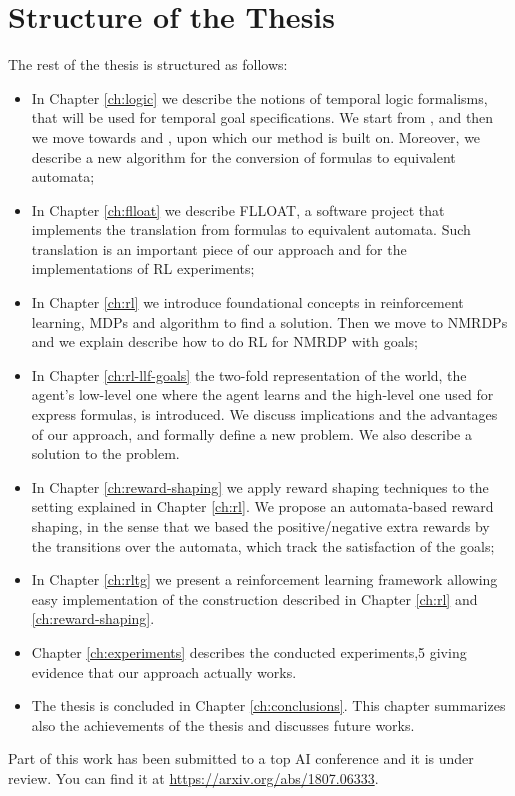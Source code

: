 \section{Structure of the Thesis}\label{sect:intro-structure-thesis}
The rest of the thesis is structured as follows:
\begin{itemize}
	\item In Chapter \ref{ch:logic} we describe the notions of temporal logic formalisms, that will be used for temporal goal specifications. We start from \LTL, \REGEX and then we move towards \LTLf and \LDLf, upon which our method is built on. Moreover, we describe a new algorithm for the conversion of \LLf formulas to equivalent automata;
	\item In Chapter \ref{ch:flloat} we describe FLLOAT, a software project that implements the translation from \LLf formulas to equivalent automata. Such translation is an important piece of our approach and for the implementations of RL experiments;
	\item In Chapter \ref{ch:rl} we introduce foundational concepts in reinforcement learning, MDPs and algorithm to find a solution. Then we move to NMRDPs and we explain describe how to do RL for NMRDP with \LLf goals;
	\item In Chapter \ref{ch:rl-llf-goals} the two-fold representation of the world, the agent's low-level one where the agent learns and the high-level one used for express \LLf formulas, is introduced. We discuss implications and the advantages of our approach, and formally define a new problem. We also describe a solution to the problem.
	\item In Chapter \ref{ch:reward-shaping} we apply reward shaping techniques to the setting explained in Chapter \ref{ch:rl}. We propose an automata-based reward shaping, in the sense that we based the positive/negative extra rewards by the transitions over the automata, which track the satisfaction of the \LLf goals;
	\item In Chapter \ref{ch:rltg} we present a reinforcement learning framework allowing easy implementation of the construction described in Chapter \ref{ch:rl} and \ref{ch:reward-shaping}.
	\item Chapter \ref{ch:experiments} describes the conducted experiments,5 giving evidence that our approach actually works.
	\item The thesis is concluded in Chapter \ref{ch:conclusions}. This chapter summarizes also the achievements of the thesis and discusses future works.
\end{itemize}
Part of this work has been submitted to a top AI conference and it is under review. You can find it at \href{https://arxiv.org/abs/1807.06333}{https://arxiv.org/abs/1807.06333}.